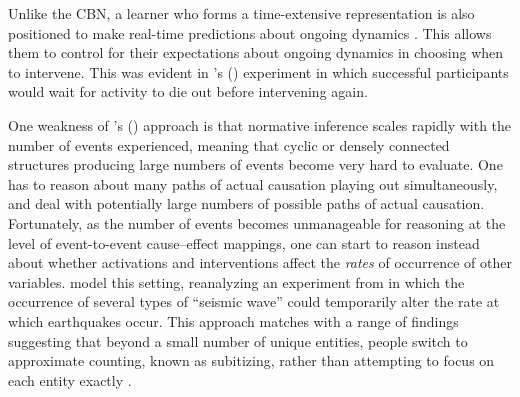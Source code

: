 \documentclass{cambridge7A}%
\def\citeapos#1{\citeauthor{#1}'s (\citeyear{#1})}
\begin{document}
Unlike the CBN, a learner who forms a time-extensive representation is also positioned to make real-time predictions about ongoing dynamics \citep{clark2013whatever}.  This allows them to control for their expectations about ongoing dynamics in choosing when to intervene.  This was evident in \citeapos{bramley2017dynamic} experiment in which successful participants would wait for activity to die out before intervening again.  %

One weakness of \citeapos{bramley2018time} approach is that normative inference scales rapidly with the number of events experienced, meaning that cyclic or densely connected structures producing large numbers of events become very hard to evaluate.  One has to reason about many paths of actual causation playing out simultaneously, and deal with potentially large numbers of possible paths of actual causation.  Fortunately, as the number of events becomes unmanageable for reasoning at the level of event-to-event cause--effect mappings, one can start to reason instead about whether activations and interventions affect the \emph{rates} of occurrence of other variables.  \cite{pacer2015upsetting} model this setting, reanalyzing an experiment from \cite{lagnado2010influence} in which the occurrence of several types of ``seismic wave'' could temporarily alter the rate at which earthquakes occur.  This approach matches with a range of findings suggesting that beyond a small number of unique entities, people switch to approximate counting, known as subitizing, rather than attempting to focus on each entity exactly \citep{mandler1982subitizing}.
\end{document}

